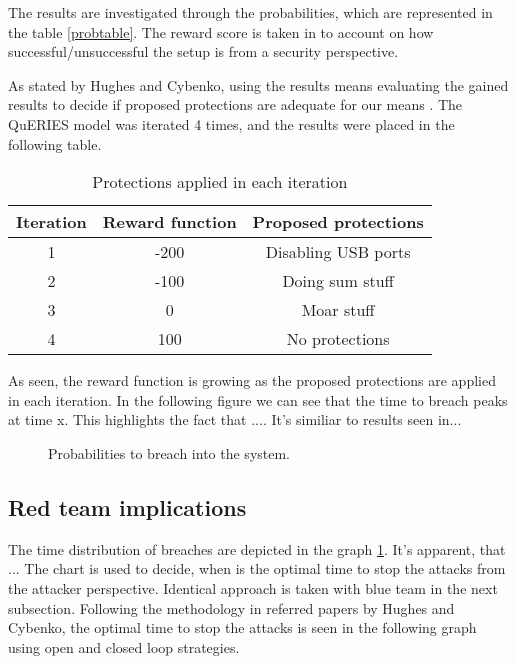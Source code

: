 The results are investigated through the probabilities, which are
represented in the table \ref{probtable}. The reward score is taken in
to account on how successful/unsuccessful the setup is from a security
perspective. 

As stated by Hughes and Cybenko, using the results means evaluating
the gained results to decide if proposed protections are adequate for
our means \cite{hughes2013quantitative}. The QuERIES model was
iterated 4 times, and the results were placed in the following table. 

\begin{table}[h!]
\centering
\begin{tabular}{|c|c|c|}
  \hline
  Iteration & Reward function & Proposed protections \\
  \hline
  1 & -200 & Disabling USB ports \\
  \hline
  2 & -100 & Doing sum stuff \\
  \hline
  3 & 0 & Moar stuff \\
  \hline
  4 & 100 & No protections \\
  \hline
\end{tabular}
\caption{Protections applied in each iteration}
\label{iterationtable}
\end{table}

As seen, the reward function is growing as the proposed protections
are applied in each iteration. In the following figure we can see that
the time to breach peaks at time x. This highlights the fact that
.... It's similiar to results seen in...

\begin{figure}[t!]
\centerline{}
\caption{Probabilities to breach into the system.}
\label{timetobreach}
\end{figure}

\subsection{Red team implications}

The time distribution of breaches are depicted in the graph
\ref{timetobreach}. It's apparent, that ... The chart is used to
decide, when is the optimal time to stop the attacks from the attacker
perspective. Identical approach is taken with blue team in the
next subsection. Following the methodology in referred papers by Hughes and Cybenko,
the optimal time to stop the attacks is seen in the following graph
using open and closed loop strategies.

